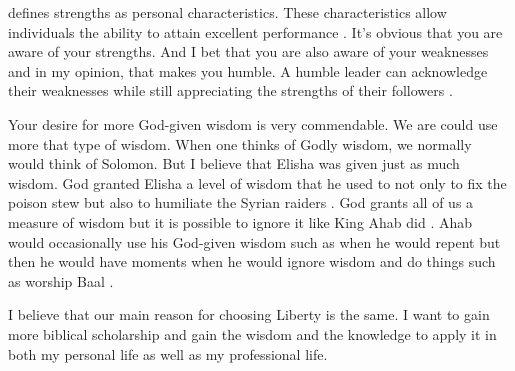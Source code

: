 \documentclass[man]{apa7}
\begin{document}
\setlength{\parindent}{10ex}
\textcite{Ding2020} defines strengths as personal characteristics. These characteristics allow individuals the ability to attain excellent performance \parencite{Ding2020}. It's obvious that you are aware of your strengths. And I bet that you are also aware of your weaknesses and in my opinion, that makes you humble. A humble leader can acknowledge their weaknesses while still appreciating the strengths of their followers \parencite{Ding2020}.

\setlength{\parindent}{10ex}
Your desire for more God-given wisdom is very commendable. We are could use more that type of wisdom. When one thinks of Godly wisdom, we normally would think of Solomon. But I believe that Elisha was given just as much wisdom. God granted Elisha a level of wisdom that he used to not only to fix the poison stew but also to humiliate the Syrian raiders \parencite{Merida2015}. God grants all of us a measure of wisdom but it is possible to ignore it like King Ahab did \parencite{Merida2015}. Ahab would occasionally use his God-given wisdom such as when he would repent but then he would have moments when he would ignore wisdom and do things such as worship Baal \parencite{Merida2015}.

\setlength{\parindent}{10ex}
I believe that our main reason for choosing Liberty is the same. I want to gain more biblical scholarship and gain the wisdom and the knowledge to apply it in both my personal life as well as my professional life.

\setlength{\parindent}{10ex}


\setlength{\parindent}{10ex}




\printbibliography
\end{document}
